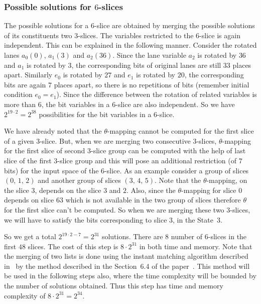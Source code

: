 \documentclass[runningheads]{llncs}
\begin{document}
\subsubsection{Possible solutions for  $6$-slices}
The possible solutions for a $6$-slice are obtained by merging the possible solutions of its constituents two $3$-slices. The variables restricted to the $6$-slice is again independent. This can be explained in the following manner. Consider the rotated lanes $a_0(0)$, $a_1(3)$ and $a_2(36)$. Since the lane variable $a_2$ is rotated by $36$ and $a_1$ is rotated by $3$, the corresponding bits of original lanes are still $33$ places apart. Similarly $e_0$ is rotated by $27$ and $e_1$ is rotated by $20$, the corresponding bits are again $7$ places apart, so there is no repetitions of bits (remember initial condition $e_0 = e_1$). Since the difference between the rotation of related variables is more than $6$, the bit variables in a $6$-slice are also independent.
So we have $2^{19\cdot 2}= 2^{38}$ possibilities for the bit variables in a $6$-slice. 

We have already noted that the $\theta$-mapping cannot be computed for the first slice of a given $3$-slice. But, when we are merging two consecutive $3$-slices, $\theta$-mapping for the first slice of second $3$-slice group can be computed with the help of last slice of the first $3$-slice group and this will pose an additional restriction (of $7$ bits) for the input space of the $6$-slice.
As an example consider a group of slices $(0,\,1,\,2)$ and another group of slices $(3,\,4,\,5)$. Note that the $\theta$-mapping, on the slice $3$, depends on the slice $3$ and $2$. Also, since the $\theta$-mapping for slice $0$ depends on slice $63$ which is not available in the two group of slices therefore $\theta$ for the first slice can't be computed. So when we are merging these two $3$-slices, we will have to satisfy the bits corresponding to slice $3$, in the State~3. 

So we get a total $2^{19\cdot 2 - 7} = 2^{31}$ solutions. There are $8$ number of $6$-slices in the first $48$ slices.
The cost of this step is $8 \cdot 2^{31}$ in both time and memory. Note that the merging of two lists is done using the instant matching
algorithm described in~\cite{naya2011improve} by the method described in the Section~6.4 of the paper~\cite{naya2011practical}. This method will be used in the following steps also, where the time complexity will be bounded by the number of solutions obtained. Thus this step has time and memory complexity of $8 \cdot 2^{31} = 2^{34}$.
\end{document}
